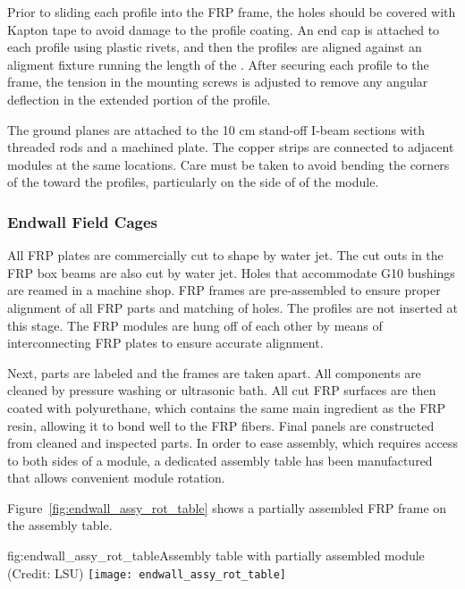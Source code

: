 Prior to sliding each profile into the FRP frame, the holes should be covered with Kapton tape to avoid damage to the profile coating. An end cap is attached to each profile using plastic rivets, and then the profiles are aligned against an aligment fixture running the length of the . After securing each profile to the frame, the tension in the mounting screws is adjusted to remove any angular deflection in the extended portion of the profile.

The ground planes are attached to the 10 cm stand-off I-beam sections with threaded rods and a machined plate. The copper strips are connected to adjacent modules at the same locations. Care must be taken to avoid bending the corners of the  toward the profiles, particularly on the  side of of the module.


\subsubsection{Endwall Field Cages}

All FRP plates are commercially cut to shape by water jet. The cut outs in the FRP box beams are also cut by water jet. Holes that accommodate G10 bushings are reamed in a machine shop. FRP frames are pre-assembled to ensure proper alignment of all FRP parts and matching of holes. The profiles are not inserted at this stage. The FRP modules are hung off of each other by means of interconnecting FRP plates to ensure accurate alignment.

Next, parts are labeled and the frames are taken apart. All components are cleaned by pressure washing or ultrasonic bath. All cut FRP surfaces are then coated with polyurethane, which contains the same main ingredient as the FRP resin, allowing it to bond well to the FRP fibers. Final panels are constructed from cleaned and inspected parts. In order to ease assembly, which requires access to both sides of a module,
a dedicated assembly table has been manufactured that allows convenient module rotation. 

Figure~\ref{fig:endwall_assy_rot_table} shows a partially assembled  FRP frame on the assembly table.
\begin{dunefigure}{fig:endwall_assy_rot_table}{Assembly table with partially assembled  module (Credit: LSU)}
 \texttt{[image: endwall\_assy\_rot\_table]}
 \end{dunefigure}


